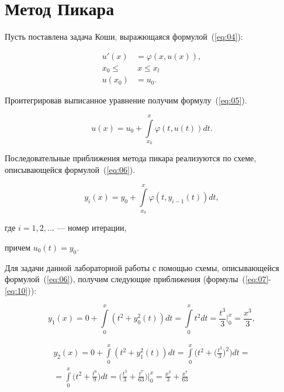 \section{Метод Пикара}

Пусть поставлена задача Коши, выражющаяся формулой~(\ref{eq:04}):

\begin{equation}\label{eq:04}
    \begin{aligned}
        u'(x) &= \varphi(x, u(x)),\\
        x_0 \leq &~x \leq x_l\\
        u(x_0) &= u_0.
    \end{aligned}
\end{equation}

Проитегрировав выписанное уравнение получим формулу~(\ref{eq:05}).

\begin{equation}\label{eq:05}
    u(x) = u_0 + \int\limits_{x_0}^{x}\varphi(t, u(t))dt.
\end{equation}

Последовательные приближения метода пикара реализуются по схеме,
описывающейся формулой~(\ref{eq:06}).

\begin{equation}\label{eq:06}
    y_{i}(x) = y_0 + \int\limits_{x_0}^{x}\varphi(t, y_{i - 1}(t))dt,
\end{equation}

где $i = 1, 2, ...$ --- номер итерации,

причем $u_0(t) = y_0$.

Для задачи данной лабораторной работы с помощью схемы, описывающейся
формулой~(\ref{eq:06}), получим следующие приближения
(формулы~(\ref{eq:07}-\ref{eq:10})):

\begin{equation}\label{eq:07}
    y_1(x) = 0 + \int\limits_0^x(t^2 + y_0^2(t))dt = \int\limits_0^x t^2 dt =
    \frac{t^3}{3}\bigg|_0^x = \frac{x^3}{3},
\end{equation}

\begin{equation}\label{eq:08}
    \begin{split}
    y_2(x) = 0 + \int\limits_0^x(t^2 + y_1^2(t))dt =
    \int\limits_0^x\bigg(t^2 + \bigg(\frac{t^3}{3}\bigg)^2\bigg) dt = \\
    = \int\limits_0^x\bigg(t^2 + \frac{t^6}{9}\bigg) dt =
    \bigg(\frac{t^3}{3} + \frac{t^7}{63}\bigg)\bigg|_0^x =
    \frac{x^3}{3} + \frac{x^7}{63}
    \end{split}
\end{equation}

